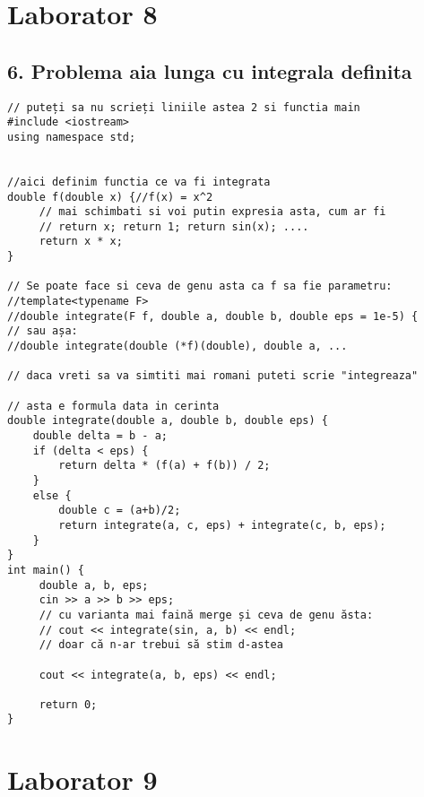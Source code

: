 \documentclass[11pt]{article}
\begin{document}
\pagebreak
\section*{Laborator 8}
\label{sec:org54d4422}
\subsection*{6. Problema aia lunga cu integrala definita}
\label{sec:orgcd1546d}
\begin{verbatim}
// puteți sa nu scrieți liniile astea 2 si functia main
#include <iostream>
using namespace std;


//aici definim functia ce va fi integrata
double f(double x) {//f(x) = x^2
     // mai schimbati si voi putin expresia asta, cum ar fi 
     // return x; return 1; return sin(x); ....
     return x * x;
}

// Se poate face si ceva de genu asta ca f sa fie parametru:
//template<typename F>
//double integrate(F f, double a, double b, double eps = 1e-5) {
// sau așa:
//double integrate(double (*f)(double), double a, ...

// daca vreti sa va simtiti mai romani puteti scrie "integreaza"

// asta e formula data in cerinta
double integrate(double a, double b, double eps) {
    double delta = b - a;
    if (delta < eps) {
        return delta * (f(a) + f(b)) / 2;
    }
    else {
        double c = (a+b)/2;
        return integrate(a, c, eps) + integrate(c, b, eps);
    }
}
int main() {
     double a, b, eps;
     cin >> a >> b >> eps;
     // cu varianta mai faină merge și ceva de genu ăsta:
     // cout << integrate(sin, a, b) << endl;
     // doar că n-ar trebui să stim d-astea

     cout << integrate(a, b, eps) << endl;

     return 0;
}
\end{verbatim}
\pagebreak

\section*{Laborator 9}
\label{sec:orgf5709be}
\end{document}
